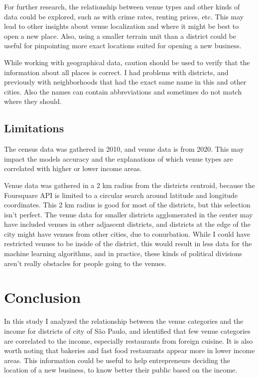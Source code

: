 \documentclass[12pt]{article}
\begin{document}
For further research, the relationship between venue types and other kinds of
data could be explored, such as with crime rates, renting prices, etc. This may
lead to other insights about venue localization and where it might be best to
open a new place. Also, using a smaller terrain unit than a district could be
useful for pinpointing more exact locations suited for opening a new business.

While working with geographical data, caution should be used to verify that the
information about all places is correct. I had problems with districts, and
previously with neighborhoods that had the exact same name in this and other
cities. Also the names can contain abbreviations and sometimes do not match
where they should.

\subsection{Limitations}

The census data was gathered in 2010, and venue data is from 2020. This may
impact the models accuracy and the explanations of which venue types are
correlated with higher or lower income areas.

Venue data was gathered in a 2 km radius from the districts centroid, because
the Foursquare API is limited to a circular search around latitude and
longitude coordinates. This 2 km radius is good for most of the districts, but
this selection isn't perfect. The venue data for smaller districts agglomerated
in the center may have included venues in other adjascent districts, and
districts at the edge of the city might have venues from other cities, due to
conurbation. While I could have restricted venues to be inside of the district,
this would result in less data for the machine learning algorithms, and in
practice, these kinds of political divisions aren't really obstacles for people
going to the venues.

\section{Conclusion}

In this study I analyzed the relationship between the venue categories and the
income for districts of city of São Paulo, and identified that few venue
categories are correlated to the income, especially restaurants from foreign
cuisine. It is also worth noting that bakeries and fast food restaurants appear
more in lower income areas. This information could be useful to help
entrepreneurs deciding the location of a new business, to know better their
public based on the income.
\end{document}
